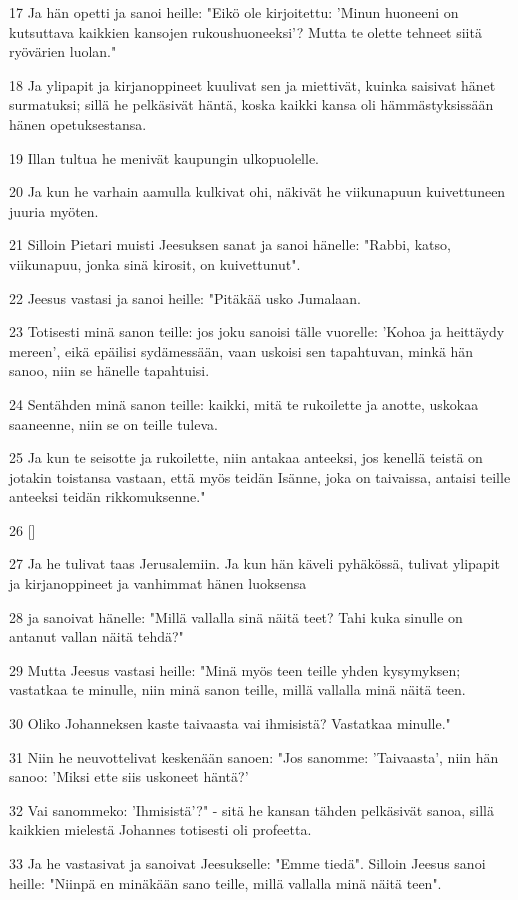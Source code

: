 \par 17 Ja hän opetti ja sanoi heille: "Eikö ole kirjoitettu: 'Minun huoneeni on kutsuttava kaikkien kansojen rukoushuoneeksi'? Mutta te olette tehneet siitä ryövärien luolan."
\par 18 Ja ylipapit ja kirjanoppineet kuulivat sen ja miettivät, kuinka saisivat hänet surmatuksi; sillä he pelkäsivät häntä, koska kaikki kansa oli hämmästyksissään hänen opetuksestansa.
\par 19 Illan tultua he menivät kaupungin ulkopuolelle.
\par 20 Ja kun he varhain aamulla kulkivat ohi, näkivät he viikunapuun kuivettuneen juuria myöten.
\par 21 Silloin Pietari muisti Jeesuksen sanat ja sanoi hänelle: "Rabbi, katso, viikunapuu, jonka sinä kirosit, on kuivettunut".
\par 22 Jeesus vastasi ja sanoi heille: "Pitäkää usko Jumalaan.
\par 23 Totisesti minä sanon teille: jos joku sanoisi tälle vuorelle: 'Kohoa ja heittäydy mereen', eikä epäilisi sydämessään, vaan uskoisi sen tapahtuvan, minkä hän sanoo, niin se hänelle tapahtuisi.
\par 24 Sentähden minä sanon teille: kaikki, mitä te rukoilette ja anotte, uskokaa saaneenne, niin se on teille tuleva.
\par 25 Ja kun te seisotte ja rukoilette, niin antakaa anteeksi, jos kenellä teistä on jotakin toistansa vastaan, että myös teidän Isänne, joka on taivaissa, antaisi teille anteeksi teidän rikkomuksenne."
\par 26 []
\par 27 Ja he tulivat taas Jerusalemiin. Ja kun hän käveli pyhäkössä, tulivat ylipapit ja kirjanoppineet ja vanhimmat hänen luoksensa
\par 28 ja sanoivat hänelle: "Millä vallalla sinä näitä teet? Tahi kuka sinulle on antanut vallan näitä tehdä?"
\par 29 Mutta Jeesus vastasi heille: "Minä myös teen teille yhden kysymyksen; vastatkaa te minulle, niin minä sanon teille, millä vallalla minä näitä teen.
\par 30 Oliko Johanneksen kaste taivaasta vai ihmisistä? Vastatkaa minulle."
\par 31 Niin he neuvottelivat keskenään sanoen: "Jos sanomme: 'Taivaasta', niin hän sanoo: 'Miksi ette siis uskoneet häntä?'
\par 32 Vai sanommeko: 'Ihmisistä'?" - sitä he kansan tähden pelkäsivät sanoa, sillä kaikkien mielestä Johannes totisesti oli profeetta.
\par 33 Ja he vastasivat ja sanoivat Jeesukselle: "Emme tiedä". Silloin Jeesus sanoi heille: "Niinpä en minäkään sano teille, millä vallalla minä näitä teen".

